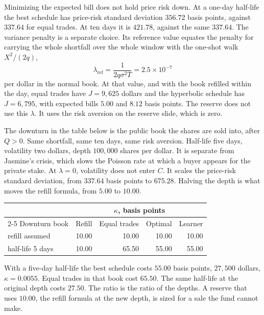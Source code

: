 \documentclass[11pt]{article}
\begin{document}
Minimizing the expected bill does not hold price risk down. At a one-day half-life the best schedule has price-risk standard deviation \(356.72\) basis points, against \(337.64\) for equal trades. At ten days it is \(421.78\), against the same \(337.64\). The variance penalty is a separate choice. Its reference value equates the penalty for carrying the whole shortfall over the whole window with the one-shot walk \(X^{2}/(2q)\),
\begin{equation}
\label{eq:lamref}
\lambda_{\mathrm{ref}} = \frac{1}{2q\sigma^{2}T} = 2.5\times 10^{-7}
\end{equation}
per dollar in the normal book. At that value, and with the book refilled within the day, equal trades have \(J = 9{,}625\) dollars and the hyperbolic schedule has \(J = 6{,}795\), with expected bills \(5.00\) and \(8.12\) basis points. The reserve does not use this \(\lambda\). It uses the risk aversion on the reserve slide, which is zero.

The downturn in the table below is the public book the shares are sold into, after \(Q > 0\). Same shortfall, same ten days, same risk aversion. Half-life five days, volatility two dollars, depth \(100{,}000\) shares per dollar. It is separate from Jasmine's crisis, which slows the Poisson rate at which a buyer appears for the private stake. At \(\lambda = 0\), volatility does not enter \(C\). It scales the price-risk standard deviation, from \(337.64\) basis points to \(675.28\). Halving the depth is what moves the refill formula, from \(5.00\) to \(10.00\).

\begin{center}
\small
\begin{tabular}{@{}lrrrr@{}}
\toprule
& \multicolumn{4}{c}{\(\kappa\), basis points} \\
\cmidrule(lr){2-5}
Downturn book & Refill & Equal trades & Optimal & Learner \\
\midrule
refill assumed   & 10.00 & 10.00 & 10.00 & 10.00 \\
half-life 5 days & 10.00 & 65.50 & 55.00 & 55.00 \\
\bottomrule
\end{tabular}
\end{center}

With a five-day half-life the best schedule costs \(55.00\) basis points, \(27{,}500\) dollars, \(\kappa = 0.0055\). Equal trades in that book cost \(65.50\). The same half-life at the original depth costs \(27.50\). The ratio is the ratio of the depths. A reserve that uses \(10.00\), the refill formula at the new depth, is sized for a sale the fund cannot make.
\end{document}
